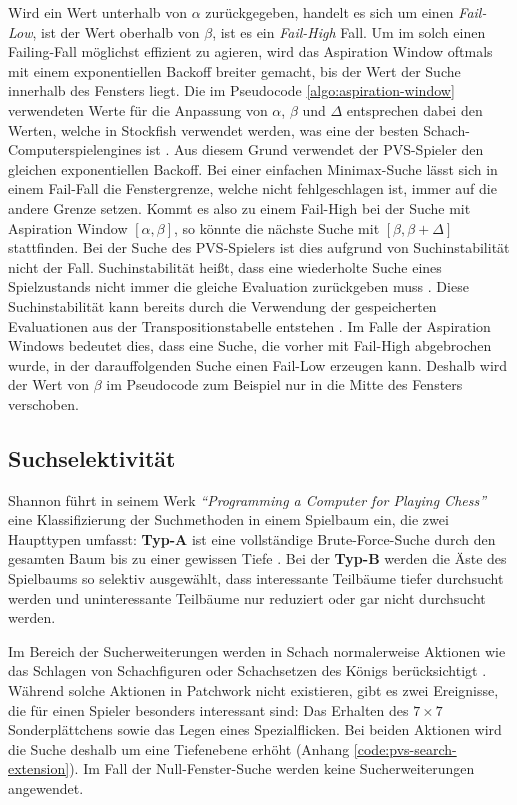 Wird ein Wert unterhalb von $\alpha$ zurückgegeben, handelt es sich um einen \emph{Fail-Low}, ist der Wert oberhalb von $\beta$, ist es ein \emph{Fail-High} Fall. Um im solch einen Failing-Fall möglichst effizient zu agieren, wird das Aspiration Window oftmals mit einem exponentiellen Backoff breiter gemacht, bis der Wert der Suche innerhalb des Fensters liegt. Die im Pseudocode \ref{algo:aspiration-window} verwendeten Werte für die Anpassung von $\alpha$, $\beta$ und $\Delta$ entsprechen dabei den Werten, welche in Stockfish verwendet werden, was eine der besten Schach-Computerspielengines ist \cite{2024.StockfishBackoff} \cite{2024.Stockfish}. Aus diesem Grund verwendet der \ac{PVS}-Spieler den gleichen exponentiellen Backoff. Bei einer einfachen Minimax-Suche lässt sich in einem Fail-Fall die Fenstergrenze, welche nicht fehlgeschlagen ist, immer auf die andere Grenze setzen. Kommt es also zu einem Fail-High bei der Suche mit Aspiration Window $\left[\alpha, \beta\right]$, so könnte die nächste Suche mit $\left[\beta, \beta + \Delta\right]$ stattfinden. Bei der Suche des \ac{PVS}-Spielers ist dies aufgrund von Suchinstabilität nicht der Fall. Suchinstabilität heißt, dass eine wiederholte Suche eines Spielzustands nicht immer die gleiche Evaluation zurückgeben muss \cite{2003.SearchInstability}. Diese Suchinstabilität kann bereits durch die Verwendung der gespeicherten Evaluationen aus der Transpositionstabelle entstehen \cite{2003.SearchInstability}. Im Falle der Aspiration Windows bedeutet dies, dass eine Suche, die vorher mit Fail-High abgebrochen wurde, in der darauffolgenden Suche einen Fail-Low erzeugen kann. Deshalb wird der Wert von $\beta$ im Pseudocode zum Beispiel nur in die Mitte des Fensters verschoben.

\subsection{Suchselektivität}

Shannon führt in seinem Werk \emph{\enquote{Programming a Computer for Playing Chess}} eine Klassifizierung der Suchmethoden in einem Spielbaum ein, die zwei Haupttypen umfasst: \textbf{Typ-A} ist eine vollständige Brute-Force-Suche durch den gesamten Baum bis zu einer gewissen Tiefe \cite[S. 8]{1950.ChessShannon}. Bei der \textbf{Typ-B} werden die Äste des Spielbaums so selektiv ausgewählt, dass interessante Teilbäume tiefer durchsucht werden und uninteressante Teilbäume nur reduziert oder gar nicht durchsucht werden.

Im Bereich der Sucherweiterungen werden in Schach normalerweise Aktionen wie das Schlagen von Schachfiguren oder Schachsetzen des Königs berücksichtigt \cite[S. 14]{1950.ChessShannon}\cite{2023.StockfishTerminology}\cite{2002.SearchExtensions}. Während solche Aktionen in Patchwork nicht existieren, gibt es zwei Ereignisse, die für einen Spieler besonders interessant sind: Das Erhalten des $7\times 7$ Sonderplättchens sowie das Legen eines Spezialflicken. Bei beiden Aktionen wird die Suche deshalb um eine Tiefenebene erhöht (Anhang \ref{code:pvs-search-extension}). Im Fall der Null-Fenster-Suche werden keine Sucherweiterungen angewendet.

